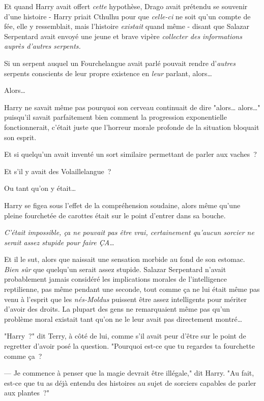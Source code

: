 Et quand Harry avait offert \emph{cette} hypothèse, Drago avait prétendu se souvenir d'une histoire - Harry priait Cthulhu pour que \emph{celle-ci} ne soit qu'un compte de fée, elle y ressemblait, mais l'histoire \emph{existait} quand même - disant que Salazar Serpentard avait envoyé une jeune et brave vipère \emph{collecter des informations auprès d'autres serpents.}

Si un serpent auquel un Fourchelangue avait parlé pouvait rendre d'\emph{autres} serpents conscients de leur propre existence en \emph{leur} parlant, alors…

Alors…

Harry ne savait même pas pourquoi son cerveau continuait de dire "alors… alors…" puisqu'il savait parfaitement bien comment la progression exponentielle fonctionnerait, c'était juste que l'horreur morale profonde de la situation bloquait son esprit.

Et si quelqu'un avait inventé un sort similaire permettant de parler aux vaches~?

Et s'il y avait des Volaillelangue~?

Ou tant qu'on y était…

Harry se figea sous l'effet de la compréhension soudaine, alors même qu'une pleine fourchetée de carottes était sur le point d'entrer dans sa bouche.

\emph{C'était impossible, ça ne pouvait pas être vrai, certainement qu'aucun sorcier ne serait assez stupide pour faire ÇA…}

Et il le sut, alors que naissait une sensation morbide au fond de son estomac. \emph{Bien sûr} que quelqu'un serait assez stupide. Salazar Serpentard n'avait probablement jamais considéré les implications morales de l'intelligence reptilienne, pas même pendant une seconde, tout comme ça ne lui était même pas venu à l'esprit que les \emph{nés-Moldus} puissent être assez intelligents pour mériter d'avoir des droits. La plupart des gens ne remarquaient même pas qu'un problème moral existait tant qu'on ne le leur avait pas directement montré…

"Harry~?" dit Terry, à côté de lui, comme s'il avait peur d'être sur le point de regretter d'avoir posé la question. "Pourquoi est-ce que tu regardes ta fourchette comme ça~?

--- Je commence à penser que la magie devrait être illégale," dit Harry. "Au fait, est-ce que tu as déjà entendu des histoires au sujet de sorciers capables de parler aux plantes~?"

\later

